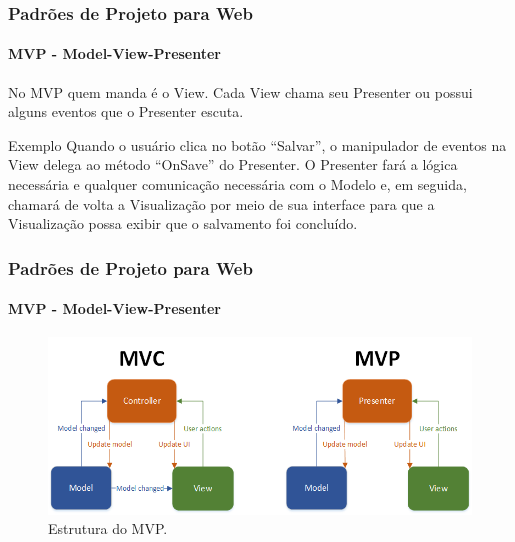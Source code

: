 \documentclass[
	9pt, %
	t, %
]{beamer}
\begin{document}
\begin{frame}
	\frametitle{Padrões de Projeto para Web}
	\framesubtitle{MVP - Model-View-Presenter}

	No MVP quem manda é o View. Cada View chama seu Presenter ou possui alguns eventos que o Presenter escuta.
	\begin{exampleblock}{Exemplo}
		Quando o usuário clica no botão “Salvar”, o manipulador de eventos na View delega ao método “OnSave” do Presenter. O Presenter fará a lógica necessária e qualquer comunicação necessária com o Modelo e, em seguida, chamará de volta a Visualização por meio de sua interface para que a Visualização possa exibir que o salvamento foi concluído.
	\end{exampleblock}

	
\end{frame}

\begin{frame}
	\frametitle{Padrões de Projeto para Web}
	\framesubtitle{MVP - Model-View-Presenter}

	\begin{figure}
		\centering
		\includegraphics[width=0.9\linewidth]{Images/mvc_mvp.png}
		\caption{Estrutura do MVP.}\label{fig:mvp}
	\end{figure}

\end{frame}
\end{document}
